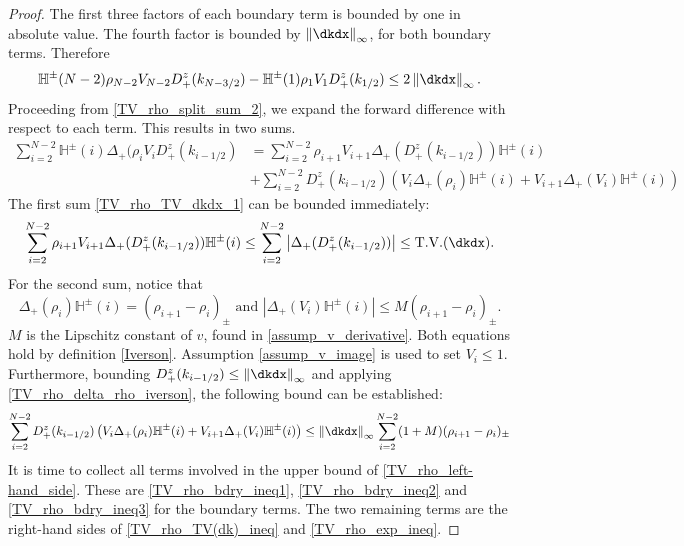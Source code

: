 \begin{proof}
 	The first three factors of each boundary term is bounded by one in absolute value. The fourth factor is bounded by $\norm{\dkdx}_\infty$, for both boundary terms. Therefore 
 	\begin{equation}
 		\mathbb{H}^\pm(N-2) \rho_{N-2} V_{N-2} D_+^z(k_{N-3/2}) - \mathbb{H}^\pm(1) \rho_{1} V_{1} D_+^z(k_{1/2}) \leq 2\norm{\dkdx}_\infty. \label{TV_rho_bdry_ineq3}
 	\end{equation}
 	Proceeding from \eqref{TV_rho_split_sum_2}, we expand the forward difference with respect to each term. This results in two sums. 
 	\begin{align}
 		\sum_{i = 2}^{N-2} \mathbb{H}^\pm(i) \Delta_+(\rho_{i} V_i D_+^z(k_{i-1/2}) &=  \sum_{i = 2}^{N-2} \rho_{i+1} V_{i+1} \Delta_+(D_+^z(k_{i-1/2})) \mathbb{H}^\pm(i) \label{TV_rho_TV_dkdx_1}\\&+ \sum_{i = 2}^{N-2} D_+^z(k_{i-1/2}) \left(V_i \Delta_+(\rho_i)\mathbb{H}^\pm(i) + V_{i+1} \Delta_+(V_i)\mathbb{H}^\pm(i)\right)  
 	\end{align}
 	The first sum \eqref{TV_rho_TV_dkdx_1} can be bounded immediately: 
 	\begin{equation}
 		\sum_{i = 2}^{N-2} \rho_{i+1} V_{i+1} \Delta_+(D_+^z(k_{i-1/2})) \mathbb{H}^\pm(i) \leq \sum_{i = 2}^{N-2} \left|\Delta_+(D_+^z(k_{i-1/2}))\right| \leq \text{T.V.}(\dkdx). \label{TV_rho_TV(dk)_ineq}
 	\end{equation}
 	For the second sum, notice that 
 	\begin{equation}
 		\Delta_+(\rho_i)\mathbb{H}^\pm(i) = (\rho_{i+1} - \rho_i)_\pm \text{ and } \left|\Delta_+(V_i)\mathbb{H}^\pm(i)\right| \leq M (\rho_{i+1} - \rho_i)_\pm. \label{TV_rho_delta_rho_iverson}
 	\end{equation}
 	$M$ is the Lipschitz constant of $v$, found in \eqref{assump_v_derivative}. Both equations hold by definition \eqref{Iverson}. Assumption \eqref{assump_v_image} is used to set $V_{i} \leq 1$. Furthermore,  bounding $D_+^z(k_{i-1/2}) \leq \norm{\dkdx}_\infty$ and applying \eqref{TV_rho_delta_rho_iverson}, the following bound can be established: 
 	\begin{align}
 		\sum_{i = 2}^{N-2} D_+^z(k_{i-1/2}) \left(V_i \Delta_+(\rho_i)\mathbb{H}^\pm(i) + V_{i+1} \Delta_+(V_i)\mathbb{H}^\pm(i)\right) \leq \norm{\dkdx}_\infty \sum_{i = 2}^{N-2} (1 + M) (\rho_{i+1} - \rho_i)_\pm \label{TV_rho_exp_ineq}
 	\end{align}
 	It is time to collect all terms involved in the upper bound of \eqref{TV_rho_left-hand_side}. These are \eqref{TV_rho_bdry_ineq1}, \eqref{TV_rho_bdry_ineq2} and \eqref{TV_rho_bdry_ineq3} for the boundary terms. The two remaining terms are the right-hand sides of \eqref{TV_rho_TV(dk)_ineq} and \eqref{TV_rho_exp_ineq}.  

\end{proof}
